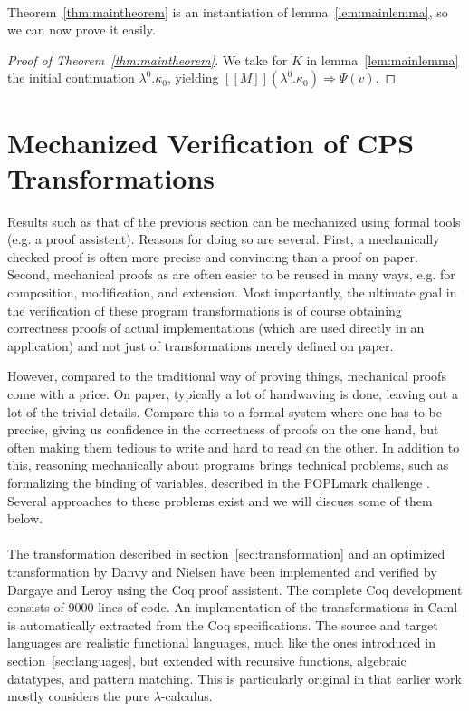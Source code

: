 \documentclass[a4paper,11pt,draft]{article}
\begin{document}
\paragraph{}

Theorem~\ref{thm:maintheorem} is an instantiation of
lemma~\ref{lem:mainlemma}, so we can now prove it easily.

\begin{proof}[Proof of Theorem~\ref{thm:maintheorem}]
We take for $K$ in lemma~\ref{lem:mainlemma} the initial continuation
$\lambda^{0}.\kappa_{0}$, yielding
$[\![M]\!] (\lambda^{0}.\kappa_{0}) \Rightarrow \Psi(v)$.
\end{proof}


\section{Mechanized Verification of CPS Transformations}\label{sec:mechanized}

Results such as that of the previous section can be mechanized using formal
tools (e.g. a proof assistent).
Reasons for doing so are several.
First, a mechanically checked proof is often more precise and convincing than
a proof on paper.
Second, mechanical proofs as are often easier to be reused in many ways, e.g.
for composition, modification, and extension.
Most importantly, the ultimate goal in the verification of these program
transformations is of course obtaining correctness proofs of actual
implementations (which are used directly in an application) and not just of
transformations merely defined on paper.

However, compared to the traditional way of proving things, mechanical proofs
come with a price.
On paper, typically a lot of handwaving is done, leaving out a lot of the
trivial details.
Compare this to a formal system where one has to be precise, giving us
confidence in the correctness of proofs on the one hand, but often making them
tedious to write and hard to read on the other.
In addition to this, reasoning mechanically about programs brings technical
problems, such as formalizing the binding of variables, described in the
POPLmark challenge \cite{Poplmark-Challenge-05}.
Several approaches to these problems exist and we will discuss some of them
below.

\paragraph{}

The transformation described in section~\ref{sec:transformation} and an
optimized transformation by Danvy and Nielsen \cite{Danvy-Nielsen-03} have
been implemented and verified by Dargaye and Leroy \cite{Dargaye-Leroy-07}
using the Coq proof assistent.
The complete Coq development consists of 9000 lines of code.
An implementation of the transformations in Caml is automatically extracted
from the Coq specifications.
The source and target languages are realistic functional languages,
much like the ones introduced in section~\ref{sec:languages}, but extended
with recursive functions, algebraic datatypes, and pattern matching.
This is particularly original in that earlier work mostly considers the pure
$\lambda$-calculus.
\end{document}
